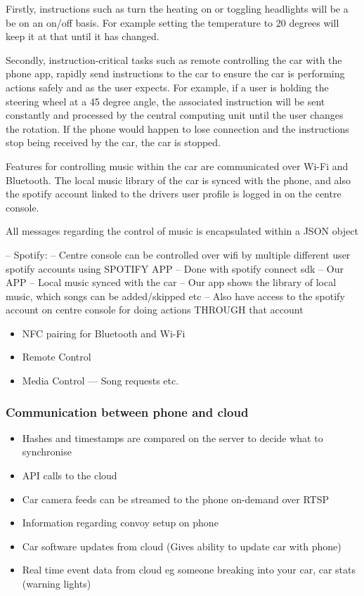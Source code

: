 \documentclass{article}
\begin{document}
Firstly, instructions such as turn the heating on or toggling headlights will be a be on an on/off basis. For example setting the temperature to 20 degrees will keep it at that until it has changed.

Secondly, instruction-critical tasks such as remote controlling the car with the phone app, rapidly send instructions to the car to ensure the car is performing actions safely and as the user expects. For example, if a user is holding the steering wheel at a 45 degree angle, the associated instruction will be sent constantly and processed by the central computing unit until the user changes the rotation. If the phone would happen to lose connection and the instructions stop being received by the car, the car is stopped.

Features for controlling music within the car are communicated over Wi-Fi and Bluetooth. The local music library of the car is synced with the phone, and also the spotify account linked to the drivers user profile is logged in on the centre console.

All messages regarding the control of music is encapsulated within a JSON object 

-- Spotify: 
	-- Centre console can be controlled over wifi by multiple different user spotify accounts using SPOTIFY APP
    -- Done with spotify connect sdk
-- Our APP
	-- Local music synced with the car
		-- Our app shows the library of local music, which songs can be added/skipped etc
        -- Also have access to the spotify account on centre console for doing actions THROUGH that account

\begin{itemize}
  \item NFC pairing for Bluetooth and Wi-Fi
  \item Remote Control
  \item Media Control --- Song requests etc.
\end{itemize}
\subsubsection{Communication between phone and cloud}
\begin{itemize}
  \item Hashes and timestamps are compared on the server to decide what to synchronise
  \item API calls to the cloud
  \item Car camera feeds can be streamed to the phone on-demand over RTSP
  \item Information regarding convoy setup on phone
  \item Car software updates from cloud (Gives ability to update car with phone)
  \item Real time event data from cloud eg someone breaking into your car, car stats (warning lights)
\end{itemize}
\end{document}
